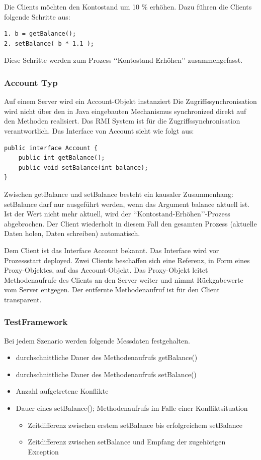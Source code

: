 \documentclass{article}
\begin{document}
Die Clients möchten den Kontostand um 10 \% erhöhen. Dazu führen die Clients folgende Schritte aus:
\begin{lstlisting}
1. b = getBalance();
2. setBalance( b * 1.1 );
\end{lstlisting}

\noindent Diese Schritte werden zum Prozess ‘‘Kontostand Erhöhen’’ zusammengefasst.

\subsubsection{Account Typ}
\label{sec:account-typ}

Auf einem Server wird ein Account-Objekt instanziert Die
Zugriffssynchronisation wird nicht über den in Java eingebauten
Mechanismus synchronized direkt auf den Methoden realisiert. Das RMI
System ist für die Zugriffssynchronisation verantwortlich. Das Interface von Account sieht wie folgt aus:
\begin{lstlisting}
public interface Account {
    public int getBalance();
    public void setBalance(int balance);    
}
\end{lstlisting}
Zwischen getBalance und setBalance besteht ein kausaler Zusammenhang: setBalance darf nur ausgeführt werden, wenn das Argument balance aktuell ist. Ist der Wert nicht mehr aktuell, wird der ‘‘Kontostand-Erhöhen’’-Prozess abgebrochen. Der Client wiederholt in diesem Fall den gesamten Prozess (aktuelle Daten holen, Daten schreiben) automatisch.

Dem Client ist das Interface Account bekannt. Das Interface wird vor Prozessstart deployed.
Zwei Clients beschaffen sich eine Referenz, in Form eines
Proxy-Objektes, auf das Account-Objekt. Das Proxy-Objekt leitet
Methodenaufrufe des Clients an den Server weiter und nimmt
Rückgabewerte vom Server entgegen. Der entfernte Methodenaufruf ist
für den Client transparent.

\subsubsection{TestFramework}
\label{sec:testframework-1}


Bei jedem Szenario werden folgende Messdaten festgehalten.
\begin{itemize}
\item durchschnittliche Dauer des Methodenaufrufs getBalance()
\item durchschnittliche Dauer des Methodenaufrufs setBalance()
\item Anzahl aufgetretene Konflikte
\item Dauer eines setBalance(); Methodenaufrufs im Falle einer Konfliktsituation
  \begin{itemize}
  \item Zeitdifferenz zwischen erstem setBalance bis erfolgreichem setBalance
  \item Zeitdifferenz zwischen setBalance und Empfang der zugehörigen Exception
  \end{itemize}
\end{itemize}
\end{document}

